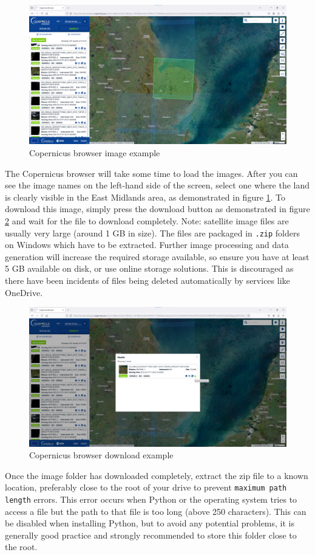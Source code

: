 \begin{figure}[H]
    \centering
    \includegraphics[width=0.5\linewidth]{contents/figures/ME copernicus example chunk.jpg}
    \caption{Copernicus browser image example}
    \label{fig:ME copernicus image example}
\end{figure}
The Copernicus browser will take some time to load the images. After you can see the image names on the left-hand side of the screen, select one where the land is clearly visible in the East Midlands area, as demonstrated in figure \ref{fig:ME copernicus image example}. To download this image, simply press the download button as demonstrated in figure \ref{fig:ME copernicus download example} and wait for the file to download completely. Note: satellite image files are usually very large (around 1 GB in size). The files are packaged in \verb|.zip| folders on Windows which have to be extracted. Further image processing and data generation will increase the required storage available, so ensure you have at least 5 GB available on disk, or use online storage solutions. This is discouraged as there have been incidents of files being deleted automatically by services like OneDrive. 

\begin{figure}[H]
    \centering
    \includegraphics[width=0.5\linewidth]{contents/figures/ME copernicus download example.jpg}
    \caption{Copernicus browser download example}
    \label{fig:ME copernicus download example}
\end{figure}
Once the image folder has downloaded completely, extract the zip file to a known location, preferably close to the root of your drive to prevent \verb|maximum path length| errors. This error occurs when Python or the operating system tries to access a file but the path to that file is too long (above 250 characters). This can be disabled when installing Python, but to avoid any potential problems, it is generally good practice and strongly recommended to store this folder close to the root. 

